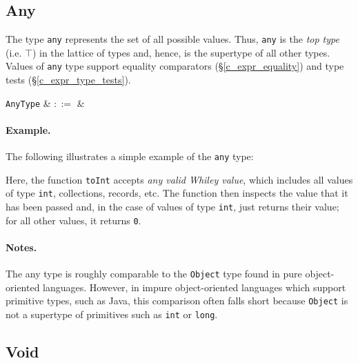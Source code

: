 
\subsection{Any}
\label{c_types_any}

The type \lstinline{any} represents the set of all possible values.  Thus, \lstinline{any} is the {\em top type} (i.e. $\top$) in the lattice of types and, hence, is the supertype of all other types.  Values of \lstinline{any} type support equality comparators (\S\ref{c_expr_equality}) and type tests (\S\ref{c_expr_type_tests}).

\begin{syntax}
  \verb+AnyType+ & $::=$ &  \\
\end{syntax}

\paragraph{Example.} The following illustrates a simple example of the \lstinline{any} type:



Here, the function \lstinline{toInt} accepts {\em any valid Whiley value}, which includes all values of type \lstinline{int}, collections, records, etc.  The function then inspects the value that it has been passed and, in the case of values of type \lstinline{int}, just returns their value; for all other values, it returns \lstinline{0}.

\paragraph{Notes.}  The any type is roughly comparable to the \lstinline{Object} type found in pure object-oriented languages.  However, in impure object-oriented languages which support primitive types, such as Java, this comparison often falls short because \lstinline{Object} is not a supertype of primitives such as \lstinline{int} or \lstinline{long}.


\subsection{Void}
\label{c_types_void}

